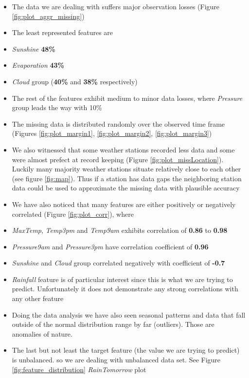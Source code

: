 \begin{itemize}
\tightlist
\item
  The data we are dealing with suffers major observation losses (Figure
  \ref{fig:plot_aggr_missing})
\item
  The least represented features are
\item
  \emph{Sunshine} \textbf{48\%}
\item
  \emph{Evaporation} \textbf{43\%}
\item
  \emph{Cloud} group (\textbf{40\%} and \textbf{38\%} respectively)
\item
  The rest of the features exhibit medium to minor data losses, where
  \emph{Pressure} group leads the way with 10\%
\item
  The missing data is distributed randomly over the observed time frame
  (Figures \ref{fig:plot_margin1}, \ref{fig:plot_margin2},
  \ref{fig:plot_margin3})
\item
  We also witnessed that some weather stations recorded less data and
  some were almost prefect at record keeping (Figure
  \ref{fig:plot_missLocation}). Luckily many majority weather stations
  situate relatively close to each other (see figure \ref{fig:map}).
  Thus if a station has data gaps the neighboring station data could be
  used to approximate the missing data with plausible accuracy
\item
  We have also noticed that many features are either positively or
  negatively correlated (Figure \ref{fig:plot_corr}), where
\item
  \emph{MaxTemp}, \emph{Temp3pm} and \emph{Temp9am} exhibits correlation
  of \textbf{0.86} to \textbf{0.98}
\item
  \emph{Pressure9am} and \emph{Pressure3pm} have correlation coefficient
  of \textbf{0.96}
\item
  \emph{Sunshine} and \emph{Cloud} group correlated negatively with
  coefficient of \textbf{-0.7}
\item
  \emph{Rainfall} feature is of particular interest since this is what
  we are trying to predict. Unfortunately it does not demonstrate any
  strong correlations with any other feature
\item
  Doing the data analysis we have also seen seasonal patterns and data
  that fall outside of the normal distribution range by far (outliers).
  Those are anomalies of nature.
\item
  The last but not least the target feature (the value we are trying to
  predict) is unbalanced. so we are dealing with unbalanced data set.
  See Figure \ref{fig:feature_distribution} \emph{RainTomorrow} plot
\end{itemize}

